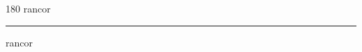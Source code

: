 
\begin{frame}
\begin{center}
\begin{turn}{180}
{\fontsize{2.5cm}{1em}\selectfont rancor}
\end{turn}
\vspace{1em}\par  
\hrule
\vspace{1em}\par  
{\fontsize{2.5cm}{1em}\selectfont rancor}
\end{center}
\end{frame}
